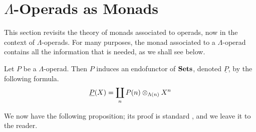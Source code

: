 %
%
%
%
%


\section{\texorpdfstring{$\Lambda$}{L}-Operads as Monads}\label{sec:lop-monad}

This section revisits the theory of monads associated to operads, now in the context of $\Lambda$-operads.
For many purposes, the monad associated to a $\Lambda$-operad contains all the information that is needed, as we shall see below.

\begin{Defi}\label{Defi:und-P}
Let $P$ be a $\Lambda$-operad. Then $P$ induces an endofunctor of $\mathbf{Sets}$, denoted $\underline{P}$, by the following formula.
  \[
	 \underline{P}(X) = \coprod_n P(n) \otimes_{\Lambda(n)} X^{n}
  \]
\end{Defi}

We now have the following proposition; its proof is standard \cite{maygeom}, and we leave it to the reader.

